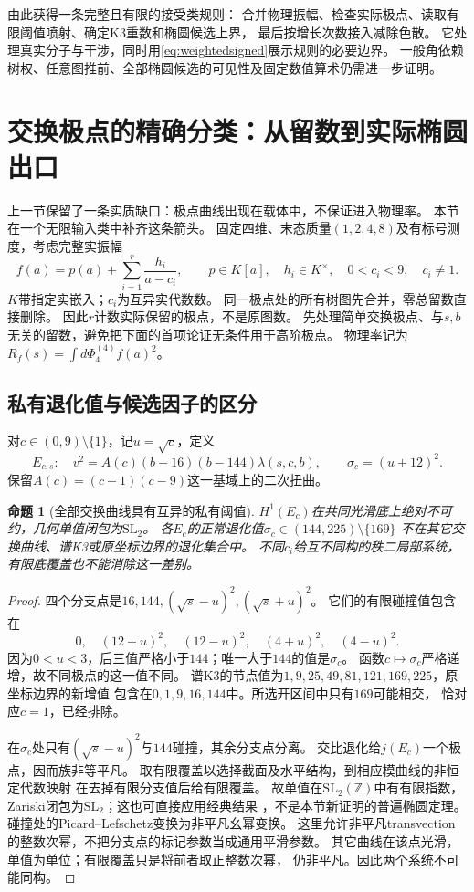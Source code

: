 \documentclass[11pt,a4paper]{ctexart}
\theoremstyle{cnplain}\newtheorem{theorem}{定理}[section]
\newtheorem{proposition}[theorem]{命题}
\theoremstyle{definition}\newtheorem{definition}[theorem]{定义}
\theoremstyle{remark}\newtheorem{remark}[theorem]{注}
\begin{document}
由此获得一条完整且有限的接受类规则：
合并物理振幅、检查实际极点、读取有限阈值喷射、确定K3重数和椭圆候选上界，
最后按增长次数接入减除色散。
它处理真实分子与干涉，同时用\eqref{eq:weightedsigned}展示规则的必要边界。
一般角依赖树权、任意图推前、全部椭圆候选的可见性及固定数值算术仍需进一步证明。


\section{交换极点的精确分类：从留数到实际椭圆出口}\label{sec:exchangeelliptic}
上一节保留了一条实质缺口：极点曲线出现在载体中，不保证进入物理率。
本节在一个无限输入类中补齐这条箭头。
固定四维、末态质量$(1,2,4,8)$及有标号测度，考虑完整实振幅
\begin{equation}\label{eq:exchangeclass}
 f(a)=p(a)+\sum_{i=1}^{r}\frac{h_i}{a-c_i},
 \qquad p\in K[a],\quad h_i\in K^\times,\quad
 0<c_i<9,\quad c_i\ne1 .
\end{equation}
$K$带指定实嵌入；$c_i$为互异实代数数。
同一极点处的所有树图先合并，零总留数直接删除。
因此$r$计数实际保留的极点，不是原图数。
先处理简单交换极点、与$s,b$无关的留数，避免把下面的首项论证无条件用于高阶极点。
物理率记为$R_f(s)=\int d\Phi_4^{(4)}f(a)^2$。

\subsection{私有退化值与候选因子的区分}
对$c\in(0,9)\setminus\{1\}$，记$u=\sqrt c$，定义
\[
 E_{c,s}:\quad v^2=A(c)(b-16)(b-144)\lambda(s,c,b),
 \qquad \sigma_c=(u+12)^2.
\]
保留$A(c)=(c-1)(c-9)$这一基域上的二次扭曲。

\begin{proposition}[全部交换曲线具有互异的私有阈值]\label{prop:exchangeprivate}
$H^1(E_c)$在共同光滑底上绝对不可约，几何单值闭包为$\mathrm{SL}_2$。
各$E_c$的正常退化值$\sigma_c\in(144,225)\setminus\{169\}$
不在其它交换曲线、谱K3或原坐标边界的退化集合中。
不同$c_i$给互不同构的秩二局部系统，有限底覆盖也不能消除这一差别。
\end{proposition}
\begin{proof}
四个分支点是$16,144,(\sqrt s-u)^2,(\sqrt s+u)^2$。
它们的有限碰撞值包含在
\[
 0,\quad(12+u)^2,\quad(12-u)^2,\quad(4+u)^2,\quad(4-u)^2 .
\]
因为$0<u<3$，后三值严格小于$144$；唯一大于$144$的值是$\sigma_c$。
函数$c\mapsto\sigma_c$严格递增，故不同极点的这一值不同。
谱K3的节点值为$1,9,25,49,81,121,169,225$，原坐标边界的新增值
包含在$0,1,9,16,144$中。所选开区间中只有$169$可能相交，
恰对应$c=1$，已经排除。

在$\sigma_c$处只有$(\sqrt s-u)^2$与$144$碰撞，其余分支点分离。
交比退化给$j(E_c)$一个极点，因而族非等平凡。
取有限覆盖以选择截面及水平结构，到相应模曲线的非恒定代数映射
在去掉有限分支值后给有限覆盖。
故单值在$\mathrm{SL}_2(\mathbb Z)$中有有限指数，
Zariski闭包为$\mathrm{SL}_2$；这也可直接应用经典结果
\cite{LvovskiEll}，不是本节新证明的普遍椭圆定理。
碰撞处的Picard--Lefschetz变换为非平凡幺幂变换。
这里允许非平凡transvection的整数次幂，不把分支点的标记参数当成通用平滑参数。
其它曲线在该点光滑，单值为单位；有限覆盖只是将前者取正整数次幂，
仍非平凡。因此两个系统不可能同构。
\end{proof}
\end{document}
